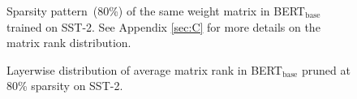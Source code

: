 \begin{figure}[t]
	\centering
	\caption{Sparsity pattern~(80\%) of the same weight matrix in BERT$_{\text{base}}$ trained on SST-2. See Appendix \ref{sec:C} for more details on the matrix rank distribution.}
	\label{fig:sp}
\end{figure}

\begin{figure}[t]
	\centering
	\caption{Layerwise distribution of average matrix rank in BERT$_{\text{base}}$ pruned  at 80\% sparsity on  SST-2.}
	\label{fig:intersim}
\end{figure}

